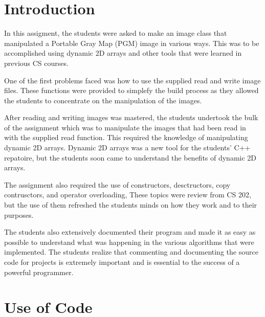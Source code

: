 \documentclass[pdftex, 11pt]{article}
\begin{document}


\pagestyle{fancy}
\renewcommand{\sectionmark}[1]{\markright{\thesection}}
\lhead{}
\cfoot{}
\renewcommand{\footrulewidth}{0.4pt}

\tableofcontents
\newpage

\cfoot{}
\renewcommand{\footrulewidth}{0.4pt}

\section{Introduction}

In this assigment, the students were asked to make an image class that manipulated a Portable Gray Map (PGM) image
in various ways. This was to be accomplished using dynamic 2D arrays and other tools that were learned in previous CS courses.

One of the first problems faced was how to use the supplied read and write image files.
These functions were provided to simplefy the build process as they allowed the students to concentrate 
on the manipulation of the images.

After reading and writing images was mastered, the students undertook the bulk of the assignment which was to
manipulate the images that had been read in with the supplied read function. This required the knowledge of
manipulating dynamic 2D arrays. Dynamic 2D arrays was a new tool for the students' C++ repatoire, but the
students soon came to understand the benefits of dynamic 2D arrays.

The assignment also required the use of constructors, desctructors, copy contrusctors, and operator overloading,
These topics were review from CS 202, but the use of them refreshed the students minds on how they work
and to their purposes.

The students also extensively documented their program and made it as easy as possible to understand what
was happening in the various algorithms that were implemented. The students realize that commenting
and documenting the source code for projects is extremely important and is essential to the success of
a powerful programmer.

\section{Use of Code}
\end{document}
